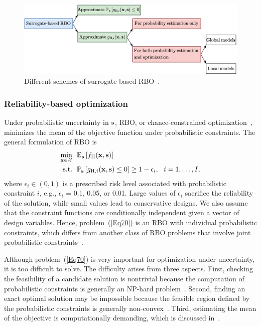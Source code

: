 \documentclass[iicol,sn-basic]{sn-jnl}%
\begin{document}
\begin{figure}
	\centering
	\includegraphics[scale=0.8]{Fig8.png}
	\caption{Different schemes of surrogate-based RBO~\citep{Moustapha2019}.}
	\label{Fig8}
\end{figure}

\subsubsection{Reliability-based optimization}\label{Sec632}

Under probabilistic uncertainty in ${\bf s}$, RBO, or chance-constrained optimization~\citep{Campi2011}, minimizes the mean of the objective function under probabilistic constraints.
The general formulation of RBO is
\begin{equation}\label{Eq70}
	\begin{aligned}
		\underset{{\bf x} \in \mathcal{X}}{\min} \ \ & \mathbb{E}_{\bf s}\left[f_\text{H}({\bf x},{\bf s})\right]\\
		\textrm{s.t.} \ \ 
		& \mathbb{P}_{\bf s}\left[g_{\text{H},i}({\bf x},{\bf s}) \leq 0\right] \geq 1-\epsilon_i,\ \ i=1,\dots,I, 
	\end{aligned}
\end{equation}
where $\epsilon_i \in (0,1)$ is a prescribed risk level associated with probabilistic constraint $i$, e.g., $\epsilon_i$ = 0.1, 0.05, or 0.01.
Large values of $\epsilon_i$ sacrifice the reliability of the solution, while small values lead to conservative designs.
We also assume that the constraint functions are conditionally independent given a vector of design variables.
Hence, problem~(\ref{Eq70}) is an RBO with individual probabilistic constraints, which differs from another class of RBO problems that involve joint probabilistic constraints~\citep{Xie2018}.

Although problem~(\ref{Eq70}) is very important for optimization under uncertainty, it is too difficult to solve. 
The difficulty arises from three aspects.
First, checking the feasibility of a candidate solution is nontrivial because the computation of probabilistic constraints is generally an NP-hard problem~\citep{Geng2019}.
Second, finding an exact optimal solution may be impossible because the feasible region defined by the probabilistic constraints is generally non-convex~\citep{Nemirovski2012}.
Third, estimating the mean of the objective is computationally demanding, which is discussed in~\Cref{Sec631}.
\end{document}
